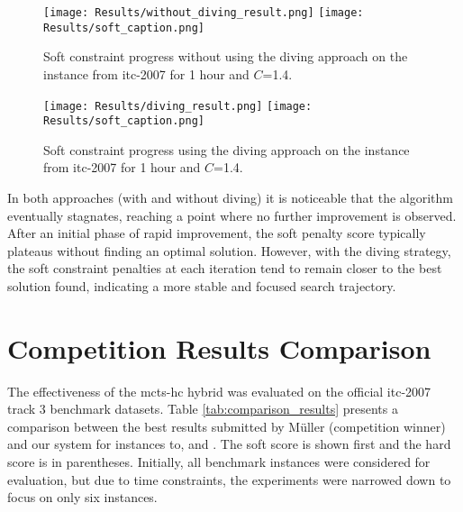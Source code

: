 \begin{figure}
 \centering
    \texttt{[image: Results/without\_diving\_result.png]}
    \texttt{[image: Results/soft\_caption.png]}
    \caption{Soft constraint progress without using the diving approach on the  instance from \ac{itc-2007} for 1 hour and \(C\)=1.4.}
    \label{fig:without_diving_result}
\end{figure}

\begin{figure}
 \centering
    \texttt{[image: Results/diving\_result.png]}
    \texttt{[image: Results/soft\_caption.png]}
    \caption{Soft constraint progress using the diving approach on the  instance from \ac{itc-2007} for 1 hour and \(C\)=1.4.}
    \label{fig:diving_result}
\end{figure}

In both approaches (with and without diving) it is noticeable that the algorithm eventually stagnates, reaching a point where no further improvement is observed. After an initial phase of rapid improvement, the soft penalty score typically plateaus without finding an optimal solution. However, with the diving strategy, the soft constraint penalties at each iteration tend to remain closer to the best solution found, indicating a more stable and focused search trajectory.

\section{Competition Results Comparison}

The effectiveness of the \ac{mcts}-\ac{hc} hybrid was evaluated on the official \ac{itc-2007} track 3 benchmark datasets. Table \ref{tab:comparison_results} presents a comparison between the best results submitted by Müller (competition winner) and our system for instances  to, and . The soft score is shown first and the hard score is in parentheses. Initially, all benchmark instances were considered for evaluation, but due to time constraints, the experiments were narrowed down to focus on only six instances.

